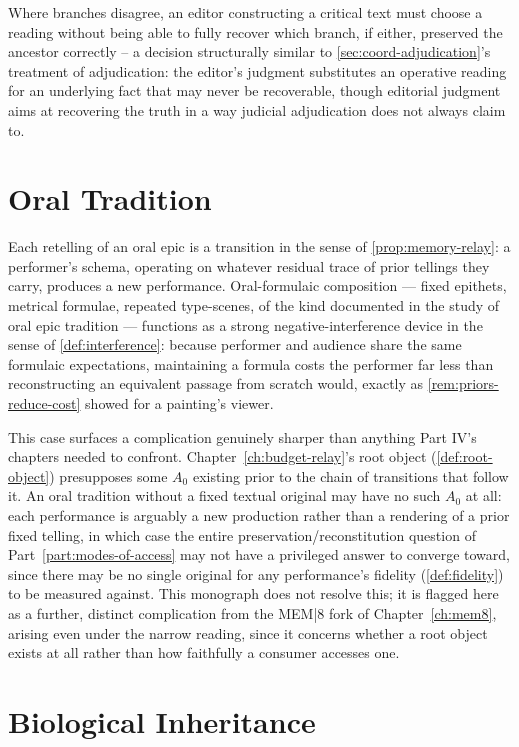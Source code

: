 Where branches disagree, an editor constructing a critical text must
choose a reading without being able to fully recover which branch, if
either, preserved the ancestor correctly -- a decision structurally
similar to \cref{sec:coord-adjudication}'s treatment of adjudication: the
editor's judgment substitutes an operative reading for an underlying
fact that may never be recoverable, though editorial judgment aims at
recovering the truth in a way judicial adjudication does not always
claim to.

\section{Oral Tradition}

Each retelling of an oral epic is a transition in the sense of
\cref{prop:memory-relay}: a performer's schema, operating on whatever
residual trace of prior tellings they carry, produces a new performance.
Oral-formulaic composition --- fixed epithets, metrical formulae,
repeated type-scenes, of the kind documented in the study of oral epic
tradition --- functions as a strong negative-interference device in the
sense of \cref{def:interference}: because performer and audience share
the same formulaic expectations, maintaining a formula costs the
performer far less than reconstructing an equivalent passage from
scratch would, exactly as \cref{rem:priors-reduce-cost} showed for a
painting's viewer.

This case surfaces a complication genuinely sharper than anything Part
IV's chapters needed to confront. Chapter~\ref{ch:budget-relay}'s root
object (\cref{def:root-object}) presupposes some $A_0$ existing prior to
the chain of transitions that follow it. An oral tradition without a
fixed textual original may have no such $A_0$ at all: each performance is
arguably a new production rather than a rendering of a prior fixed
telling, in which case the entire preservation/reconstitution question of
Part~\ref{part:modes-of-access} may not have a privileged answer to
converge toward, since there may be no single original for any
performance's fidelity (\cref{def:fidelity}) to be measured against. This
monograph does not resolve this; it is flagged here as a further, distinct
complication from the MEM|8 fork of Chapter~\ref{ch:mem8}, arising even
under the narrow reading, since it concerns whether a root object exists
at all rather than how faithfully a consumer accesses one.

\section{Biological Inheritance}

